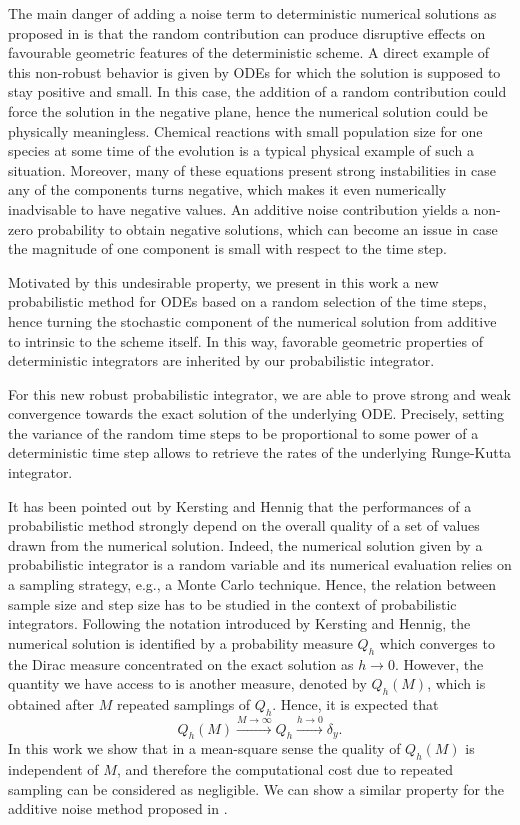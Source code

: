 \documentclass{siamart1116}
\numberwithin{theorem}{section}
\newcommand{\rightarrowtext}[1]{\ensuremath{\stackrel{#1}{\longrightarrow}}}
\newcommand{\corr}[1]{{\color{bordeaux}#1}}
\begin{document}
The main danger of adding a noise term to deterministic numerical solutions \corr{as proposed in \cite{CGS16}} is that the random contribution can produce disruptive effects on favourable geometric features of the deterministic scheme. A direct example of this non-robust behavior is given by ODEs for which the solution is supposed to stay positive and small. In this case, the addition of a random contribution could force the solution in the negative plane, hence the numerical solution could be physically meaningless. Chemical reactions with small population size for one species at some time of the evolution is a typical physical example of such a situation. Moreover, many of these equations present strong instabilities in case any of the components turns negative, which makes it even numerically inadvisable to have negative values. An additive noise contribution yields a non-zero probability to obtain negative solutions, which can become \corr{an issue} in case the magnitude of one component is small with respect to the time step.

Motivated by this undesirable property, we present in this work a new probabilistic method for ODEs based on a random selection of the time steps, hence turning the stochastic component of the numerical solution from additive to intrinsic \corr{to} the scheme itself. In this way, favorable geometric properties of deterministic integrators are inherited by our probabilistic integrator. 

For this new robust probabilistic integrator, we are able to prove strong and weak convergence towards the exact solution of the underlying ODE. Precisely, setting the variance of the random time steps to be proportional to some power of a deterministic time step allows to retrieve the rates of the underlying Runge-Kutta integrator.

It has been pointed out by Kersting and Hennig \cite{KeH16} that the performances of a probabilistic method strongly depend on the overall quality of a set of values drawn from the numerical solution. Indeed, the numerical solution given by a probabilistic integrator is a random variable and its numerical evaluation relies on a sampling strategy, e.g., a Monte Carlo technique. Hence, the relation between sample size and step size has to be studied in the context of probabilistic integrators. Following the notation introduced by Kersting and Hennig, the numerical solution is identified by a probability measure $Q_h$ which converges to the Dirac \corr{measure} concentrated on the exact solution as $h\to 0$. \corr{However}, the quantity we have access to is another measure, denoted by $Q_h(M)$, which is obtained after $M$ repeated samplings of $Q_h$. Hence, it is expected that
\begin{equation}
Q_h(M) \rightarrowtext{M\to\infty} Q_h \rightarrowtext{h\to 0} \delta_y.
\end{equation}
In this work we show that in a mean-square sense the quality of $Q_h(M)$ is independent of $M$, and therefore the computational cost due to repeated sampling can be considered as negligible. \corr{We can show} a similar property for the additive noise method \corr{proposed in} \cite{CGS16}.
\end{document}
